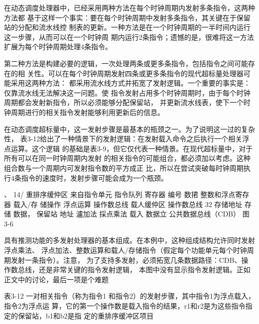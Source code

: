 在动态调度处理器中，已经采用两种方法在每个时钟周期内发射多条指令，这两种方法都
基于这样一个事实：要在每个时钟周期中发射多条指令，其关键在于保留站的分配和流水线控
制表的更新。一种方法是在一个时钟周期的一半时间内运行这一步骤，从而可以在一个时钟周
期内运行2条指令；遗憾的是，很难将这一方法扩展为每个时钟周期处理4条指令。

第二种方法是构建必要的逻辑，一次处理两条或更多条指令，包括指令之间可能存在的相
关性。可以在每个时钟周期发射四条或更多条指令的现代超标量处理器可能采用这两种方法：
都采用流水线方式并拓宽了发射逻辑。一个重要的事实是：仅靠流水线无法解决这一问题。使
指令发射占用多个时钟周期时，由于每个时钟周期都会发射新指令，所以必须能够分配保留站，
并更新流水线表，使下一个时钟周期进行的相关指令发射能够利用更新后的信息。

在动态调度超标量中，这一发射步骤是最基本的瓶颈之一。为了说明这一过的复杂性，
表3-12给出了一种情景下的发射逻辑：在发射载入命令之后执行一个相关浮点运算。这个逻辑
的基础是表3-9，但它仅代表一种情景。在现代超标量中，对于所有可以在同一时钟周期内发射
的相关指令的可能组合，都必须加以考虑。这种组合数与一个周期内可发射指令数的平方成正
比，所以在尝试突破每时钟周期执行4条指令的速度时，发射步骤可能会成为一个瓶颈。

、
14/
重排序缓仲区
来自指令单元
指令队列
寄存器
编号
数捃
整数和浮点寄存器
载入/存
储操作
浮点运算
操作数总线
载人缓仲区
操作数总线
32
存储地址
存储
数据，
保留站
地址
瀘加法
採点乘法
载入
数据立
公共数据总线（CDB）
图 3-6

具有推测功能的多发射处理器的基本组成。在本例中，这种组成结构允许同时发射浮点乘法、
浮点加法、整数运算和载人/存储指令（假定每个功能单元每个时钟周期发射一条指令）。注意，
为了支持多发射，必须拓宽几条数据路径：CDB、操作数总线，还是非常关键的指令发射逻辑，
本图中没有显示指令发射逻辑。正如正文中的讨论，最后一项是个难题

表3-12 一对相关指令（称为指令1 和指令2）的发射步骤，其中指令1为浮点载入，指令2为浮点运
算，它的第一个操作数是载入指令的结果，r1和r2是为这些指令指定的保留站，b1和b2是指
定的重排序缓冲区项目

